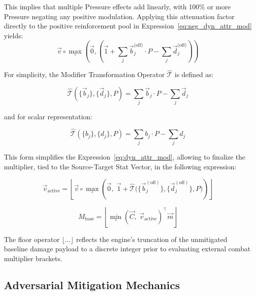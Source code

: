 \documentclass[twocolumn,10pt]{article}
\begin{document}
This implies that multiple Pressure effects add linearly, with 100\% or more Pressure negating any positive modulation. Applying this attenuation factor directly to the positive reinforcement pool in Expression~\ref{eq:neg_dyn_attr_mod} yields:
\begin{equation}
  \label{eq:dyn_attr_mod}
  \vec{v} \circ \max_\circ \left(\vec{0}, \left(\vec{1} + \sum_{j}{\vec{b}_{j}^{\text{(off)}}} \cdot P - \sum_{j}{\vec{d}_{j}^{\text{(off)}}} \right) \right)
\end{equation}

For simplicity, the Modifier Transformation Operator $\hat{\mathcal{T}}$ is defined as:

\begin{equation}
 \hat{\mathcal{T}} (\{\vec{b}_j\}, \{\vec{d}_j\}, P) = \sum_{j}{\vec{b}_{j}} \cdot P - \sum_{j}{\vec{d}_{j}}
\end{equation}

and for scalar representation:

\begin{equation}
 \hat{\mathcal{T}} (\{b_j\}, \{d_j\}, P) = \sum_{j}{b_{j}} \cdot P - \sum_{j}{d_{j}}
\end{equation}

This form simplifies the Expression~\ref{eq:dyn_attr_mod}, allowing to finalize the multiplier, tied to the Source-Target Stat Vector, in the following expression:

\begin{equation}
\label{eq:v_active}
  \vec{v}_{\text{active}} = \left\lfloor \vec{v} \circ \max_\circ \left( \vec{0}, \; \vec{1} + \hat{\mathcal{T}}\big(\{\vec{b}_j^{(\text{off})}\}, \{\vec{d}_j^{(\text{off})}\}, P\big) \right) \right\rfloor
\end{equation}

\begin{equation}
\label{eq:base_modulated_damage}
  M_{\text{base}} = \left\lfloor \min_\circ \left( \vec{C}, \; \vec{v}_{\text{active}} \right)^\top \vec{m} \right\rfloor
\end{equation}

The floor operator $\lfloor \dots \rfloor$ reflects the engine's truncation of the unmitigated baseline damage payload to a discrete integer prior to evaluating external combat multiplier brackets.

\subsection{Adversarial Mitigation Mechanics}
\end{document}
